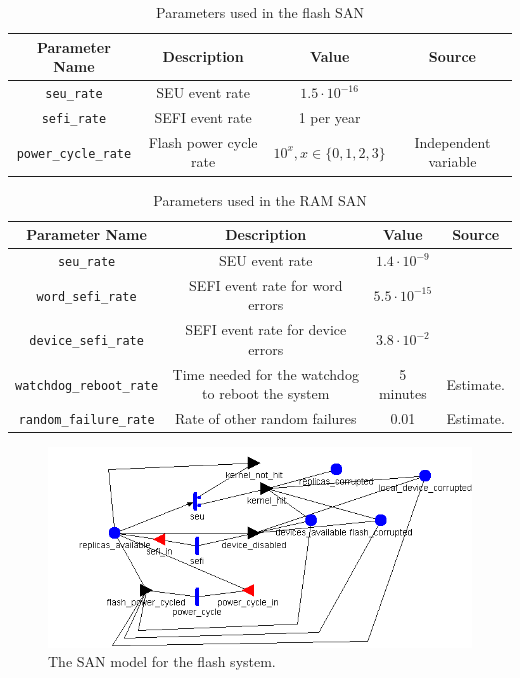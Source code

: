 \begin{table}[width = 0.5\textwidth]
\centering
\begin{tabular}{|c|c|c|c|}
\hline
{\bf Parameter Name} & {\bf Description} & {\bf Value} & {\bf Source}\\
\hline
\texttt{seu\_rate} & SEU event rate & $1.5\cdot 10^{-16}$ & \cite{Oldham2008TID} \\
\texttt{sefi\_rate} & SEFI event rate & 1 per year & \cite{Oldham2008TID} \\
\texttt{power\_cycle\_rate} & Flash power cycle rate & $10^x, x\in\{0, 1, 2, 3\}$ & Independent variable \\
\hline
\end{tabular}
\caption{Parameters used in the flash SAN}
\label{tab:flashparameters}
\end{table}

\begin{table}[width = 0.5\textwidth]
\centering
\begin{tabular}{|c|c|c|c|}
\hline
{\bf Parameter Name} & {\bf Description} & {\bf Value} & {\bf Source}\\
\hline
\texttt{seu\_rate} & SEU event rate & $1.4 \cdot 10^{-9}$ & \cite{Gliem2012memory} \\
\texttt{word\_sefi\_rate} & SEFI event rate for word errors & $5.5 \cdot 10^{-15}$ & \cite{Gliem2012memory} \\
\texttt{device\_sefi\_rate} & SEFI event rate for device errors & $3.8 \cdot 10^{-2}$ & \cite{Gliem2012memory} \\
\texttt{watchdog\_reboot\_rate} & Time needed for the watchdog to reboot the system & 5 minutes & Estimate.\\
\texttt{random\_failure\_rate} & Rate of other random failures & 0.01 & Estimate.\\
\hline
\end{tabular}
\caption{Parameters used in the RAM SAN}
\label{tab:ramparameters}
\end{table}

\begin{figure}
\centering
\includegraphics[scale=0.8]{pretty_redundant_controller_flash_system}
\caption{The SAN model for the flash system.}
\label{fig:flashsan}
\end{figure}


